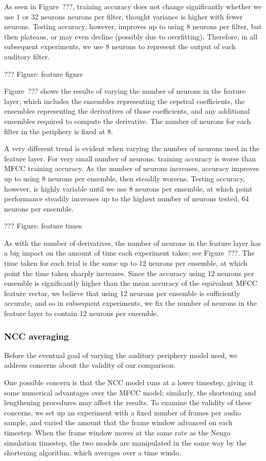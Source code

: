 As seen in Figure~???,
training accuracy
does not change significantly
whether we use
1 or 32 neurons neurons per filter,
thought variance is higher
with fewer neurons.
Testing accuracy,
however, improves up to
using 8 neurons per filter,
but then plateaus,
or may even decline
(possibly due to overfitting).
Therefore, in all
subsequent experiments,
we use 8 neurons to represent
the output of each auditory filter.

??? Figure: feature figure

Figure~??? shows the results
of varying the number of neurons
in the feature layer,
which includes the ensembles
representing the cepstral coefficients,
the ensembles representing
the derivatives of those coefficients,
and any additional ensembles required
to compute the derivative.
The number of neurons for each filter
in the periphery is fixed at 8.

A very different trend is evident
when varying the number of neurons
used in the feature layer.
For very small number of neurons,
training accuracy is worse
than MFCC training accuracy.
As the number of neurons increases,
accuracy improves up to
using 8 neurons per ensemble,
then steadily worsens.
Testing accuracy, however,
is highly variable until
we use 8 neurons per ensemble,
at which point performance
steadily increases up to
the highest number of neurons tested,
64 neurons per ensemble.

??? Figure: feature times

As with the number of derivatives,
the number of neurons in the feature layer
has a big impact on the amount of time
each experiment takes;
see Figure~???.
The time taken for each trial
is the same up to 12 neurons per ensemble,
at which point
the time taken sharply increases.
Since the accuracy using 12 neurons per ensemble
is significantly higher than
the mean accuracy of the equivalent MFCC feature vector,
we believe that using 12 neurons per ensemble
is sufficiently accurate,
and so in subsequent experiments,
we fix the number of neurons
in the feature layer to contain
12 neurons per ensemble.

\subsubsection{NCC averaging}

Before the eventual goal of
varying the auditory periphery model used,
we address concerns about the validity
of our comparison.

One possible concern is that
the NCC model runs at a lower timestep,
giving it some numerical advantages
over the MFCC model;
similarly, the shortening and lengthening
procedures may affect the results.
To examine the validity of these concerns,
we set up an experiment
with a fixed number of frames
per audio sample,
and varied the amount that the frame window
advanced on each timestep.
When the frame window moves at the
same rate as the Nengo simulation timestep,
the two models are manipulated
in the same way by the
shortening algorithm,
which averages over a time windo.

